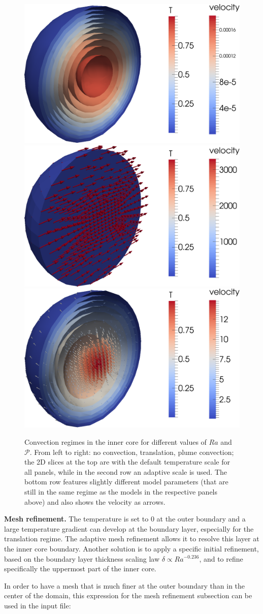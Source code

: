 \documentclass{article}
\begin{document}
\begin{figure}[h]
\begin{center}
   \vspace{1cm}
    \includegraphics[width=0.25\linewidth]{cookbooks/inner_core_convection/no_convection.png}
    \includegraphics[width=0.25\linewidth]{cookbooks/inner_core_convection/translation.png}
    \includegraphics[width=0.25\linewidth]{cookbooks/inner_core_convection/convection.png}
    \caption{Convection regimes in the inner core for different values of $Ra$ and $\mathcal{P}$. From left to right: no convection, translation, plume convection; the 2D slices at the top are with the default temperature scale for all panels, while in the second row an adaptive scale is used. The bottom row features slightly different model parameters (that are still in the same regime as the models in the respective panels above) and also shows the velocity as arrows.}
    \label{fig:inner-core-regimes}
       \end{center}
\end{figure}

\vspace{0.3cm}
\textbf{Mesh refinement.}
The temperature is set to 0 at the outer boundary and a large temperature gradient can develop at the boundary layer, especially for the translation regime. The adaptive mesh refinement allows it to resolve this layer at the inner core boundary. Another solution is to apply a specific initial refinement, based on the boundary layer thickness scaling law $\delta \propto Ra^{-0.236}$, and to refine specifically the uppermost part of the inner core. 

In order to have a mesh that is much finer at the outer boundary than in the center of the domain, this expression for the mesh refinement subsection can be used in the input file:

\end{document}
